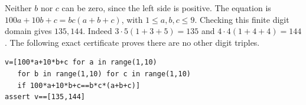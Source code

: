Neither $b$ nor $c$ can be zero, since the left side is positive. The equation is $100a+10b+c=bc(a+b+c)$, with $1\le a,b,c\le9$. Checking this finite digit domain gives $\boxed{135,144}$. Indeed $3\cdot5(1+3+5)=135$ and $4\cdot4(1+4+4)=144$. The following exact certificate proves there are no other digit triples.
\begin{verbatim}
v=[100*a+10*b+c for a in range(1,10)
   for b in range(1,10) for c in range(1,10)
   if 100*a+10*b+c==b*c*(a+b+c)]
assert v==[135,144]
\end{verbatim}
